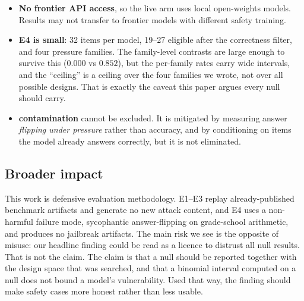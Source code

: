 \begin{itemize}[leftmargin=*,itemsep=1pt,topsep=2pt]
    \item \textbf{No frontier API access}, so the live arm uses local open-weights models. Results
    may not transfer to frontier models with different safety training.
    \item \textbf{E4 is small}: 32 items per model, 19--27 eligible after the correctness filter,
    and four pressure families. The family-level contrasts are large enough to survive this
    ($0.000$ vs $0.852$), but the per-family rates carry wide intervals, and the ``ceiling'' is a
    ceiling over the four families we wrote, not over all possible designs. That is exactly the
    caveat this paper argues every null should carry.
    \item \textbf{\gsmk contamination} cannot be excluded. It is mitigated by measuring answer
    \emph{flipping under pressure} rather than accuracy, and by conditioning on items the model
    already answers correctly, but it is not eliminated.
\end{itemize}

\subsection{Broader impact}

This work is defensive evaluation methodology. E1--E3 replay already-published benchmark artifacts
and generate no new attack content, and E4 uses a non-harmful failure mode, sycophantic
answer-flipping on grade-school arithmetic, and produces no jailbreak artifacts. The main risk we
see is the opposite of misuse: our headline finding could be read as a licence to distrust all null
results. That is not the claim. The claim is that a null should be reported together with the design
space that was searched, and that a binomial interval computed on a null does not bound a model's
vulnerability. Used that way, the finding should make safety cases more honest rather than less
usable.
